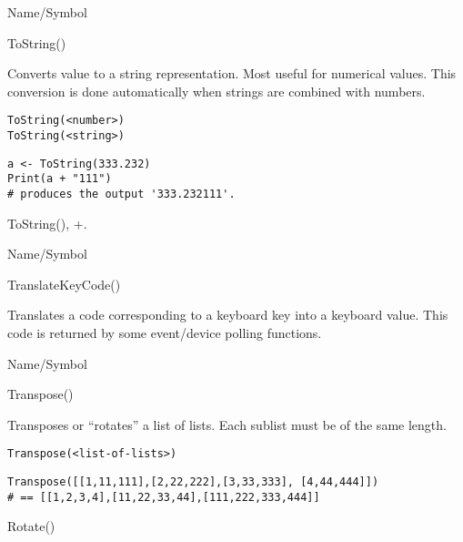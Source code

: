 \rl


\begin{desc}{Name/Symbol}
\item[Name/Symbol]  	ToString()

\item[Description]  	Converts value to a string representation. Most useful for 
		numerical values.  This conversion is done automatically when 
		strings are combined with numbers.

\item[Usage]     
\begin{verbatim}
ToString(<number>)
ToString(<string>)
\end{verbatim}

\item[Example]
\begin{verbatim}
a <- ToString(333.232)
Print(a + "111")
# produces the output '333.232111'.
\end{verbatim}
		

\item[See Also]    	ToString(), +.
\end{desc}

\rl


\begin{desc}{Name/Symbol}
\item[Name/Symbol]  	TranslateKeyCode()

\item[Description] 	Translates a code corresponding to a keyboard key into a 
		keyboard value.  This code is returned by some event/device 
		polling functions.

\item[Usage]		

\item[Example]	

\item[See Also]	
\end{desc}

\rl


\begin{desc}{Name/Symbol}
\item[Name/Symbol]  	Transpose()

\item[Description] 	Transposes or ``rotates'' a list of lists.  Each sublist
	     	must be of the same length.

\item[Usage]       	
\begin{verbatim}
Transpose(<list-of-lists>)
\end{verbatim}

\item[Example]     	
\begin{verbatim}
Transpose([[1,11,111],[2,22,222],[3,33,333], [4,44,444]])
# == [[1,2,3,4],[11,22,33,44],[111,222,333,444]]
\end{verbatim}

\item[See Also]    	Rotate()
\end{desc}

